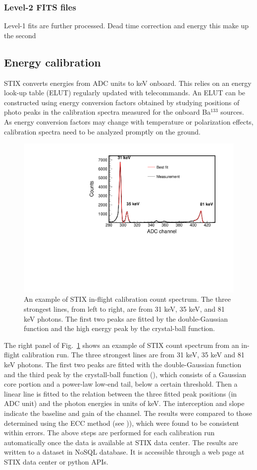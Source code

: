 \documentclass{aa}
\begin{document}
\subsubsection{Level-2 FITS files}
Level-1 fits are further processed. 
Dead time  correction and energy this make up the second


\subsection{Energy calibration}
STIX converts energies from ADC units to keV onboard. This relies on
an energy look-up table (ELUT) regularly updated  with telecommands.
An ELUT can be constructed using energy conversion factors obtained by studying
 positions of photo peaks in the calibration spectra measured for the onboard Ba$^{133}$ sources.  
 As energy conversion factors may change with temperature 
 or polarization effects,  calibration spectra need to be analyzed promptly on the ground. 


\begin{figure}
 \centering
  \includegraphics[width=0.8\linewidth]{figures/cal-fit.pdf}
  \caption{An example of STIX in-flight calibration count spectrum.
  The three strongest lines, from left to right, are from 31 keV, 35 keV, and 81 keV
  photons. The first two peaks are fitted by the double-Gaussian function and the high energy peak by  
  the crystal-ball function. }
    \label{fig:cal-fit}
\end{figure}
The right panel of Fig.~\ref{fig:cal-fit} shows 
an example of STIX count spectrum from an in-flight calibration run.  
The three strongest lines are from 31 keV, 35 keV and 81 keV photons. 
The first two peaks are fitted with the double-Gaussian function and the third peak
by the crystall-ball function (\cite{crsystallball}),  which consists of a Gaussian core portion 
and a power-law low-end tail, below a certain threshold.
Then a linear line is fitted to the relation between
the three fitted peak positions (in ADC unit) and the photon energies in units of keV.  
The interception and slope indicate the baseline and gain of the channel. 
The results were compared to those determined using the ECC method (see \cite{ecc,ecc2})), 
 which were found to be consistent within errors.
The above steps are performed for each calibration run automatically 
once the data is available at STIX data center.  The results are written to a
 dataset in  NoSQL database.  It is accessible through a web page at STIX data center or python APIs.
\end{document}
